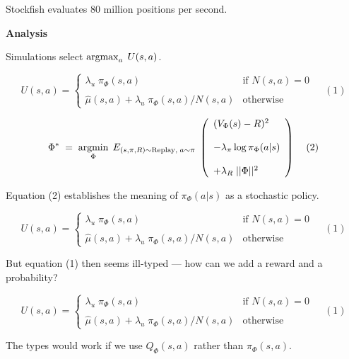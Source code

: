{\vfill
Stockfish evaluates 80 million positions per second.

\slide{}

\centerline{\bf Analysis}

\vfill


Simulations select $\operatorname*{argmax}_a\;U(s,a)$.

{\huge
$$U(s,a) =  \left\{\begin{array}{ll}\lambda_u \; \pi_\Phi(s,a) &\mbox{if $N(s,a) = 0$} \\ \\ \hat{\mu}(s,a) + \lambda_u\; \pi_\Phi(s,a)/N(s,a) & \mbox{otherwise} \end{array}\right. \;\;\;\;(1)$$

\vfill
$$\Phi^*\; = \;\operatorname*{argmin}_\Phi \;E_{(s,\pi,R) \sim \mathrm{Replay},\;a \sim \pi}\;\left(\begin{array}{l} (V_\Phi(s) - R)^2 \\ \\ - \lambda_\pi\log \pi_\Phi(a|s) \\ \\ + \lambda_R\;||\Phi||^2\end{array}\right)\;\;\;\;(2)$$
}
\vfill
Equation (2) establishes the meaning of $\pi_\Phi(a|s)$ as a stochastic policy.


$$U(s,a) =  \left\{\begin{array}{ll}\lambda_u \; \pi_\Phi(s,a) &\mbox{if $N(s,a) = 0$} \\ \\ \hat{\mu}(s,a) + \lambda_u\; \pi_\Phi(s,a)/N(s,a) & \mbox{otherwise} \end{array}\right. \;\;\;\;(1)$$

\vfill
But equation (1) then seems ill-typed --- how can we add a reward and a probability?


$$U(s,a) =  \left\{\begin{array}{ll}\lambda_u \; \pi_\Phi(s,a) &\mbox{if $N(s,a) = 0$} \\ \\ \hat{\mu}(s,a) + \lambda_u\; \pi_\Phi(s,a)/N(s,a) & \mbox{otherwise} \end{array}\right. \;\;\;\;(1)$$

\vfill
The types would work if we use $Q_\Phi(s,a)$ rather than $\pi_\Phi(s,a)$.


}
